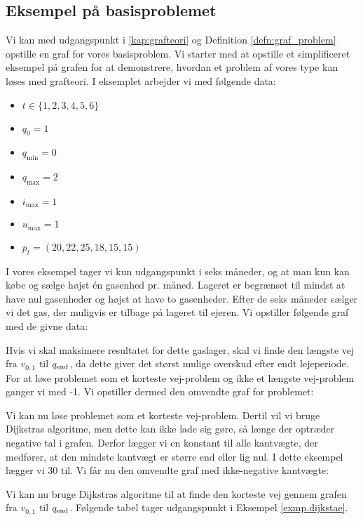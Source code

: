 \subsection{Eksempel på basisproblemet} \label{kap:graf_basis}
Vi kan med udgangspunkt i \autoref{kap:grafteori} og Definition \ref{defn:graf_problem} opstille en graf for vores basisproblem. Vi starter med at opstille et simplificeret eksempel på grafen for at demonstrere, hvordan et problem af vores type kan løses med grafteori. I eksemplet arbejder vi med følgende data:
\begin{itemize}
  \item $t \in \{1,2,3,4,5,6\}$
  \item $q_{0}=1$
  \item $q_{\min}=0$
  \item $q_{\max}=2$
  \item $i_{\max}=1$
  \item $u_{\max}=1$
  \item $p_{t}=(20,22,25,18,15,15)$
\end{itemize}

I vores eksempel tager vi kun udgangspunkt i seks måneder, og at man kun kan købe og sælge højst én gasenhed pr. måned. Lageret er begrænset til mindst at have nul gasenheder og højst at have to gasenheder. Efter de seks måneder sælger vi det gas, der muligvis er tilbage på lageret til ejeren. Vi opstiller følgende graf med de givne data:



Hvis vi skal maksimere resultatet for dette gaslager, skal vi finde den længste vej fra $v_{0,1}$ til $q_{\textrm{end}}$, da dette giver det størst mulige overskud efter endt lejeperiode. For at løse problemet som et korteste vej-problem og ikke et længste vej-problem ganger vi med -1. Vi opstiller dermed den omvendte graf for problemet:



Vi kan nu løse problemet som et korteste vej-problem. Dertil vil vi bruge Dijkstras algoritme, men dette kan ikke lade sig gøre, så længe der optræder negative tal i grafen. Derfor lægger vi en konstant til alle kantvægte, der medfører, at den mindste kantvægt er større end eller lig nul. I dette eksempel lægger vi 30 til. Vi får nu den omvendte graf med ikke-negative kantvægte:




Vi kan nu bruge Dijkstras algoritme til at finde den korteste vej gennem grafen fra $v_{0,1}$ til $q_{\textrm{end}}$. Følgende tabel tager udgangspunkt i Eksempel \ref{exmp.dijkstae}.

